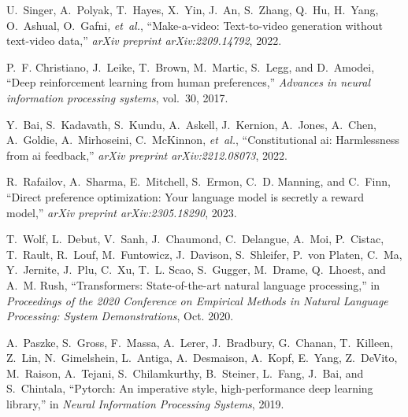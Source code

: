 \begin{thebibliography}{10}
U.~Singer, A.~Polyak, T.~Hayes, X.~Yin, J.~An, S.~Zhang, Q.~Hu, H.~Yang,
  O.~Ashual, O.~Gafni, {\em et~al.}, ``Make-a-video: Text-to-video generation
  without text-video data,'' {\em arXiv preprint arXiv:2209.14792}, 2022.

P.~F. Christiano, J.~Leike, T.~Brown, M.~Martic, S.~Legg, and D.~Amodei, ``Deep
  reinforcement learning from human preferences,'' {\em Advances in neural
  information processing systems}, vol.~30, 2017.

Y.~Bai, S.~Kadavath, S.~Kundu, A.~Askell, J.~Kernion, A.~Jones, A.~Chen,
  A.~Goldie, A.~Mirhoseini, C.~McKinnon, {\em et~al.}, ``Constitutional ai:
  Harmlessness from ai feedback,'' {\em arXiv preprint arXiv:2212.08073}, 2022.

R.~Rafailov, A.~Sharma, E.~Mitchell, S.~Ermon, C.~D. Manning, and C.~Finn,
  ``Direct preference optimization: Your language model is secretly a reward
  model,'' {\em arXiv preprint arXiv:2305.18290}, 2023.

T.~Wolf, L.~Debut, V.~Sanh, J.~Chaumond, C.~Delangue, A.~Moi, P.~Cistac,
  T.~Rault, R.~Louf, M.~Funtowicz, J.~Davison, S.~Shleifer, P.~von Platen,
  C.~Ma, Y.~Jernite, J.~Plu, C.~Xu, T.~L. Scao, S.~Gugger, M.~Drame, Q.~Lhoest,
  and A.~M. Rush, ``Transformers: State-of-the-art natural language
  processing,'' in {\em Proceedings of the 2020 Conference on Empirical Methods
  in Natural Language Processing: System Demonstrations}, Oct. 2020.

A.~Paszke, S.~Gross, F.~Massa, A.~Lerer, J.~Bradbury, G.~Chanan, T.~Killeen,
  Z.~Lin, N.~Gimelshein, L.~Antiga, A.~Desmaison, A.~Kopf, E.~Yang, Z.~DeVito,
  M.~Raison, A.~Tejani, S.~Chilamkurthy, B.~Steiner, L.~Fang, J.~Bai, and
  S.~Chintala, ``Pytorch: An imperative style, high-performance deep learning
  library,'' in {\em Neural Information Processing Systems}, 2019.

\end{thebibliography}

